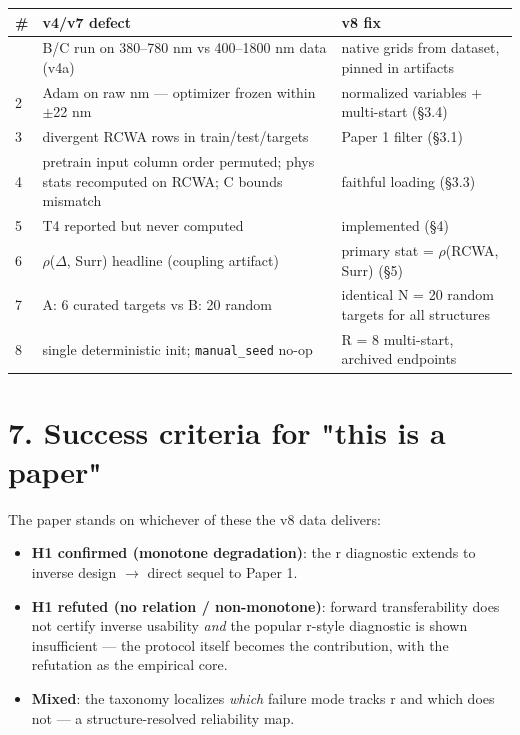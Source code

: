 \documentclass[11pt,a4paper]{article}
\newcounter{none}   %
\providecommand{\tightlist}{\setlength{\itemsep}{0pt}\setlength{\parskip}{0pt}}
\begin{document}
\begingroup
\setlength{\tabcolsep}{2pt}\tiny
{}
\label{stab:5}
{\def\LTcaptype{none} %
\begin{longtable}[]{@{}lll@{}}
\toprule\noalign{}
\# & v4/v7 defect & v8 fix \\
\midrule\noalign{}
\endhead
\bottomrule\noalign{}
\endlastfoot
1 & B/C run on 380--780 nm vs 400--1800 nm data (v4a) & native grids from dataset, pinned in artifacts \\
2 & Adam on raw nm --- optimizer frozen within \ensuremath{\pm}22 nm & normalized variables + multi-start (\S{}3.4) \\
3 & divergent RCWA rows in train/test/targets & Paper 1 filter (\S{}3.1) \\
4 & pretrain input column order permuted; phys stats recomputed on RCWA; C bounds mismatch & faithful loading (\S{}3.3) \\
5 & T4 reported but never computed & implemented (\S{}4) \\
6 & \ensuremath{\rho}(\ensuremath{\Delta}, Surr) headline (coupling artifact) & primary stat = \ensuremath{\rho}(RCWA, Surr) (\S{}5) \\
7 & A: 6 curated targets vs B: 20 random & identical N = 20 random targets for all structures \\
8 & single deterministic init; \texttt{manual\_seed} no-op & R = 8 multi-start, archived endpoints \\
\end{longtable}
}
\endgroup

\section*{7. Success criteria for "this is a paper"}

The paper stands on whichever of these the v8 data delivers:

\begin{itemize}
\tightlist
\item
  \textbf{H1 confirmed (monotone degradation)}: the r diagnostic extends to
  inverse design \ensuremath{\rightarrow} direct sequel to Paper 1.
\item
  \textbf{H1 refuted (no relation / non-monotone)}: forward transferability does
  not certify inverse usability \emph{and} the popular r-style diagnostic is shown
  insufficient --- the protocol itself becomes the contribution, with the
  refutation as the empirical core.
\item
  \textbf{Mixed}: the taxonomy localizes \emph{which} failure mode tracks r and which
  does not --- a structure-resolved reliability map.
\end{itemize}
\end{document}

